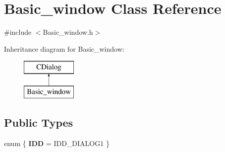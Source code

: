 \hypertarget{class_basic__window}{}\section{Basic\+\_\+window Class Reference}
\label{class_basic__window}


{\ttfamily \#include $<$Basic\+\_\+window.\+h$>$}

Inheritance diagram for Basic\+\_\+window\+:\begin{figure}[H]
\begin{center}
\leavevmode
\includegraphics[height=2.000000cm]{class_basic__window}
\end{center}
\end{figure}
\subsection*{Public Types}
\begin{DoxyCompactItemize}
\item 
\hypertarget{class_basic__window_a2fb129e769a0ea51892cf6ed9fa7d988}{}enum \{ {\bfseries I\+D\+D} = I\+D\+D\+\_\+\+D\+I\+A\+L\+O\+G1
 \}\label{class_basic__window_a2fb129e769a0ea51892cf6ed9fa7d988}

\end{DoxyCompactItemize}
